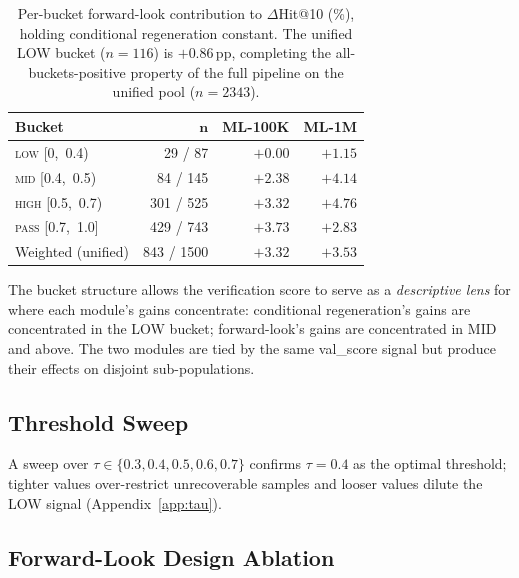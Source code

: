 \documentclass[11pt]{article}
\begin{document}
\begin{table}[!t]
\centering
\small
\setlength{\tabcolsep}{6pt}
\begin{tabular}{lrrr}
\toprule
\textbf{Bucket} & $\mathbf{n}$ & \textbf{ML-100K} & \textbf{ML-1M} \\
\midrule
\textsc{low}  [0,~0.4)   &  29 / 87    & $+0.00$ & $+1.15$\\
\textsc{mid}  [0.4,~0.5) &  84 / 145   & $+2.38$ & $+4.14$\\
\textsc{high} [0.5,~0.7) & 301 / 525   & $+3.32$ & $+4.76$\\
\textsc{pass} [0.7,~1.0] & 429 / 743   & $+3.73$ & $+2.83$\\
\midrule
Weighted (unified) & 843 / 1500 & $+3.32$ & $+3.53$\\
\bottomrule
\end{tabular}
\caption{Per-bucket forward-look contribution to $\Delta$Hit@10 (\%), holding conditional regeneration constant. The unified LOW bucket ($n{=}116$) is $+0.86$\,pp, completing the all-buckets-positive property of the full pipeline on the unified pool (\textit{$n{=}2343$}).}
\label{tab:bucket}
\end{table}

The bucket structure allows the verification score to serve as a \emph{descriptive lens} for where each module's gains concentrate: conditional regeneration's gains are concentrated in the LOW bucket; forward-look's gains are concentrated in MID and above. The two modules are tied by the same val\_score signal but produce their effects on disjoint sub-populations.

\subsection{Threshold Sweep}
A sweep over $\tau \in \{0.3, 0.4, 0.5, 0.6, 0.7\}$ confirms $\tau{=}0.4$ as the optimal threshold; tighter values over-restrict unrecoverable samples and looser values dilute the LOW signal (Appendix~\ref{app:tau}).
\label{sec:tau}


\subsection{Forward-Look Design Ablation}
\label{sec:forward_ablation}
\end{document}
